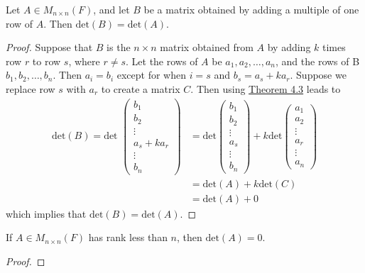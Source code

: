\begin{theorem}
    Let \( A \in {M}_{n \times n}(F) \), and let \( B  \) be a matrix obtained by adding a multiple of one row of \( A  \). Then \( \text{det}(B) = \text{det}(A) \).
\end{theorem}
\begin{proof}
Suppose that \( B  \) is the \( n \times n \) matrix obtained from \( A  \) by adding \( k  \) times row \( r  \) to row \( s  \), where \( r  \neq s   \). Let the rows of \( A  \) be \( {a}_{1}, {a}_{2}, \dots , {a}_{n} \), and the rows of B \( {b}_{1}, {b}_{2}, \dots, {b}_{n}  \). Then \( {a}_{i} = {b}_{i} \) except for when \( i = s  \) and \( {b}_{s} = {a}_{s} + {ka}_{r} \). Suppose we replace row \( s  \) with \( {a}_{r} \) to create a matrix \( C  \). Then using {\hyperref[Theorem 4.3]{Theorem 4.3}} leads to 
\begin{align*}
    \text{det}(B) = \text{det } \begin{pmatrix} 
               {b}_{1} \\
               {b}_{2} \\
               \vdots \\
               {a}_{s} + {ka}_{r} \\
               \vdots \\
               {b}_{n}
              \end{pmatrix} 
                 &= \text{det} \begin{pmatrix} 
               {b}_{1} \\
               {b}_{2} \\
               \vdots \\
               {a}_{s} \\
               \vdots \\
               {b}_{n}
              \end{pmatrix} + k \text{det}\begin{pmatrix} 
                         {a}_{1} \\
                         {a}_{2} \\
                         \vdots \\
                         {a}_{r} \\
                         \vdots \\
                         {a}_{n}
                        \end{pmatrix}    \\
            &= \text{det}(A) + k \text{det}(C) \\
            &= \text{det}(A) + 0 \tag{Corollary to Theorem 4.4}
\end{align*}
which implies that \( \text{det}(B) = \text{det}(A) \).
\end{proof}

\begin{corollary}
    If \( A \in {M}_{n \times n}(F) \) has rank less than \( n  \), then \( \text{det}(A) = 0  \).
\end{corollary}
\begin{proof}

\end{proof}

